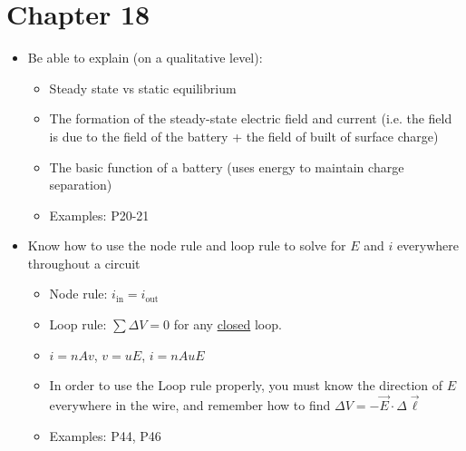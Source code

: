 \documentclass{article}
\begin{document}
\section*{Chapter 18}
\begin{itemize}
	\item Be able to explain (on a qualitative level):
	\begin{itemize}
		\item Steady state vs static equilibrium
		\item The formation of the steady-state electric field and current (i.e. the field is due to the field of the battery + the field of built of surface charge)
		\item The basic function of a battery (uses energy to maintain charge separation)
		\item Examples: P20-21
	\end{itemize}
	\item Know how to use the node rule and loop rule to solve for $E$ and $i$ everywhere throughout a circuit
	\begin{itemize}
		\item Node rule: $i_\mathrm{in} = i_\mathrm{out}$
		\item Loop rule: $\sum \Delta V = 0$ for any \underline{closed} loop.
		\item $i=nAv$, $v=uE$, $i=nAuE$
		\item In order to use the Loop rule properly, you must know the direction of $E$ everywhere in the wire, and remember how to find $\Delta V = -\vec{E}\cdot \Delta \vec{\ell}$
		\item Examples: P44, P46
	\end{itemize}
\end{itemize}
\end{document}
